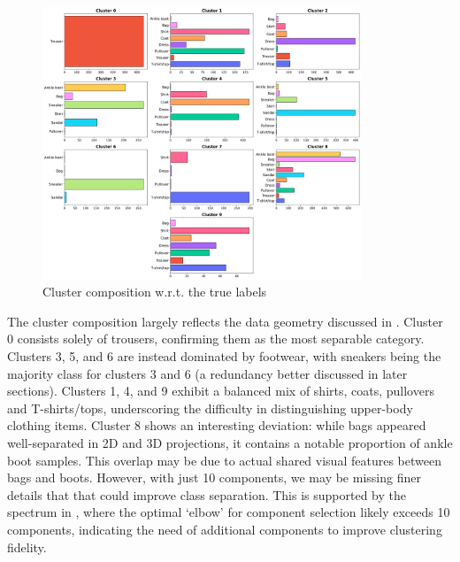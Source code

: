 \begin{figure}[ht]
    \centering
    \includegraphics[width=0.85\textwidth]{images/clusters_composition_AC_3x4grid.png}
    \caption{\footnotesize Cluster composition w.r.t. the true labels}
    \label{fig:cluster_composition}
\end{figure}

The cluster composition largely reflects the data geometry discussed in . Cluster 0 consists solely of trousers, confirming them as the most 
separable category. Clusters 3, 5, and 6 are instead dominated by footwear, with sneakers being the majority class for clusters 3 and 6 (a redundancy better
discussed in later sections). Clusters 1, 4, and 9 exhibit a balanced mix of shirts, coats, pullovers and T-shirts/tops, underscoring 
the difficulty in distinguishing upper-body clothing items. Cluster 8 shows an interesting deviation: while 
bags appeared well-separated in 2D and 3D projections, it contains a notable proportion of ankle boot samples.
This overlap may be due to actual shared visual features between bags and boots. However, with just 10 components, we may be missing finer details 
that that could improve class separation. This is supported by the spectrum in , where the optimal `elbow' 
for component selection likely exceeds 10 components, indicating the need of additional components to improve clustering fidelity.

